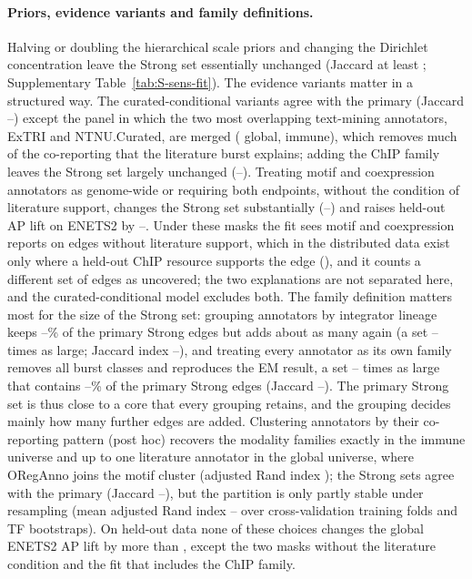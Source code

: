 \paragraph{Priors, evidence variants and family definitions.}
Halving or doubling the hierarchical scale priors and changing the Dirichlet concentration leave the Strong set essentially unchanged (Jaccard at least \nSensPriorMin{}; Supplementary Table~\ref{tab:S-sens-fit}).
The evidence variants matter in a structured way.
The curated-conditional variants agree with the primary (Jaccard \nSensVarKeepMin{}--\nSensVarKeepMax{}) except the panel in which the two most overlapping text-mining annotators, ExTRI and NTNU.Curated, are merged (\nSensVarMergedGlob{} global, \nSensVarMergedImm{} immune), which removes much of the co-reporting that the literature burst explains; adding the ChIP family leaves the Strong set largely unchanged (\nSensVarChipMin{}--\nSensVarChipMax{}).
Treating motif and coexpression annotators as genome-wide or requiring both endpoints, without the condition of literature support, changes the Strong set substantially (\nSensVarLeakMin{}--\nSensVarLeakMax{}) and raises held-out AP lift on ENETS2 by \nHsVarMaskMin{}--\nHsVarMaskMax{}.
Under these masks the fit sees motif and coexpression reports on edges without literature support, which in the distributed data exist only where a held-out ChIP resource supports the edge (), and it counts a different set of edges as uncovered; the two explanations are not separated here, and the curated-conditional model excludes both.
The family definition matters most for the size of the Strong set: grouping annotators by integrator lineage keeps \nSensGrpLinKeepPctMin{}--\nSensGrpLinKeepPctMax{}\% of the primary Strong edges but adds about as many again (a set \nSensGrpLinSizeMin{}--\nSensGrpLinSizeMax{} times as large; Jaccard index \nSensGrpLinJacMin{}--\nSensGrpLinJacMax{}), and treating every annotator as its own family removes all burst classes and reproduces the EM result, a set \nSensGrpSingSizeMin{}--\nSensGrpSingSizeMax{} times as large that contains \nSensGrpSingKeepPctMin{}--\nSensGrpSingKeepPctMax{}\% of the primary Strong edges (Jaccard \nSensGrpSingMin{}--\nSensGrpSingMax{}).
The primary Strong set is thus close to a core that every grouping retains, and the grouping decides mainly how many further edges are added.
Clustering annotators by their co-reporting pattern (post hoc) recovers the modality families exactly in the immune universe and up to one literature annotator in the global universe, where ORegAnno joins the motif cluster (adjusted Rand index \nGrpAriFullGlob{}); the Strong sets agree with the primary (Jaccard \nSensGrpDdMin{}--\nSensGrpDdMax{}), but the partition is only partly stable under resampling (mean adjusted Rand index \nGrpAriMin{}--\nGrpAriMax{} over cross-validation training folds and TF bootstraps).
On held-out data none of these choices changes the global ENETS2 AP lift by more than \nHsMaxNonLeak{}, except the two masks without the literature condition and the fit that includes the ChIP family.

